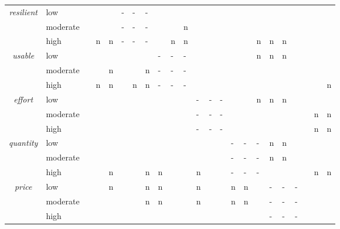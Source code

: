 \begin{table}
\begin{center}
\begin{tabularx}{\columnwidth}{cl|X|X|X|X|X|X|X|X|X|X|X|X|X|X|X|X|X|X|X|X|X|}
            \multirow{3}{*}{\textit{resilient}}     & low       &   &   &   & - & - & - &   &   &   &   &   &   &   &   &   &   &   &   &   &   &   \\ \cline{2-23}
                                                    & moderate  &   &   &   & - & - & - &   &   & n &   &   &   &   &   &   &   &   &   &   &   &   \\ \cline{2-23}
                                                    & high      &   & n & n & - & - & - &   & n & n &   &   &   &   &   & n & n & n &   &   &   &   \\ \hline

            \multirow{3}{*}{\textit{usable}}        & low       &   &   &   &   &   &   & - & - & - &   &   &   &   &   & n & n & n &   &   &   &   \\ \cline{2-23}
                                                    & moderate  &   &   & n &   &   & n & - & - & - &   &   &   &   &   &   &   &   &   &   &   &   \\ \cline{2-23}
                                                    & high      &   & n & n &   & n & n & - & - & - &   &   &   &   &   &   &   &   &   &   &   & n \\ \hline

            \multirow{3}{*}{\textit{effort}}        & low       &   &   &   &   &   &   &   &   &   & - & - & - &   &   & n & n & n &   &   &   &   \\ \cline{2-23}
                                                    & moderate  &   &   &   &   &   &   &   &   &   & - & - & - &   &   &   &   &   &   &   & n & n \\ \cline{2-23}
                                                    & high      &   &   &   &   &   &   &   &   &   & - & - & - &   &   &   &   &   &   &   & n & n \\ \hline

            \multirow{3}{*}{\textit{quantity}}      & low       &   &   &   &   &   &   &   &   &   &   &   &   & - & - & - & n & n &   &   &   &   \\ \cline{2-23}
                                                    & moderate  &   &   &   &   &   &   &   &   &   &   &   &   & - & - & - & n & n &   &   &   &   \\ \cline{2-23}
                                                    & high      &   &   & n &   &   & n & n &   &   & n &   &   & - & - & - &   &   &   &   & n & n  \\ \hline

            \multirow{3}{*}{\textit{price}}         & low       &   &   & n &   &   & n & n &   &   & n &   &   & n & n &   & - & - & - &   &   &   \\ \cline{2-23}
                                                    & moderate  &   &   &   &   &   & n & n &   &   & n &   &   & n & n &   & - & - & - &   &   &   \\ \cline{2-23}
                                                    & high      &   &   &   &   &   &   &   &   &   &   &   &   &   &   &   & - & - & - &   &   &   \\ \hline


\end{tabularx}
\end{center}
\end{table}
